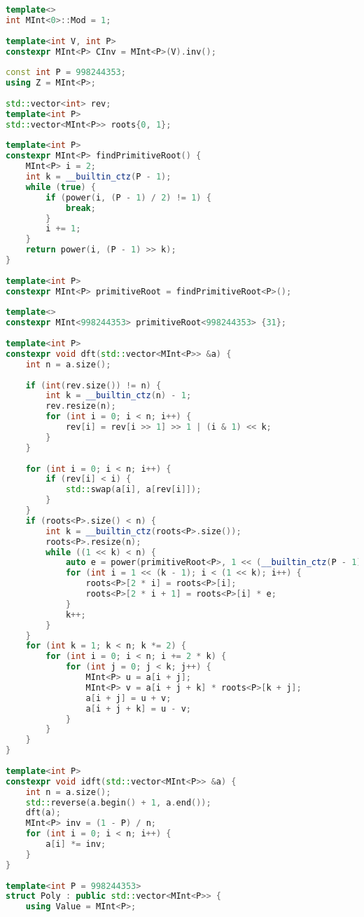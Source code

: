 \begin{lstlisting}[language=c++]
template<>
int MInt<0>::Mod = 1;
 
template<int V, int P>
constexpr MInt<P> CInv = MInt<P>(V).inv();
 
const int P = 998244353;
using Z = MInt<P>;
 
std::vector<int> rev;
template<int P>
std::vector<MInt<P>> roots{0, 1};
 
template<int P>
constexpr MInt<P> findPrimitiveRoot() {
    MInt<P> i = 2;
    int k = __builtin_ctz(P - 1);
    while (true) {
        if (power(i, (P - 1) / 2) != 1) {
            break;
        }
        i += 1;
    }
    return power(i, (P - 1) >> k);
}
 
template<int P>
constexpr MInt<P> primitiveRoot = findPrimitiveRoot<P>();
 
template<>
constexpr MInt<998244353> primitiveRoot<998244353> {31};
 
template<int P>
constexpr void dft(std::vector<MInt<P>> &a) {
    int n = a.size();
     
    if (int(rev.size()) != n) {
        int k = __builtin_ctz(n) - 1;
        rev.resize(n);
        for (int i = 0; i < n; i++) {
            rev[i] = rev[i >> 1] >> 1 | (i & 1) << k;
        }
    }
     
    for (int i = 0; i < n; i++) {
        if (rev[i] < i) {
            std::swap(a[i], a[rev[i]]);
        }
    }
    if (roots<P>.size() < n) {
        int k = __builtin_ctz(roots<P>.size());
        roots<P>.resize(n);
        while ((1 << k) < n) {
            auto e = power(primitiveRoot<P>, 1 << (__builtin_ctz(P - 1) - k - 1));
            for (int i = 1 << (k - 1); i < (1 << k); i++) {
                roots<P>[2 * i] = roots<P>[i];
                roots<P>[2 * i + 1] = roots<P>[i] * e;
            }
            k++;
        }
    }
    for (int k = 1; k < n; k *= 2) {
        for (int i = 0; i < n; i += 2 * k) {
            for (int j = 0; j < k; j++) {
                MInt<P> u = a[i + j];
                MInt<P> v = a[i + j + k] * roots<P>[k + j];
                a[i + j] = u + v;
                a[i + j + k] = u - v;
            }
        }
    }
}
 
template<int P>
constexpr void idft(std::vector<MInt<P>> &a) {
    int n = a.size();
    std::reverse(a.begin() + 1, a.end());
    dft(a);
    MInt<P> inv = (1 - P) / n;
    for (int i = 0; i < n; i++) {
        a[i] *= inv;
    }
}
 
template<int P = 998244353>
struct Poly : public std::vector<MInt<P>> {
    using Value = MInt<P>;
     

\end{lstlisting}
